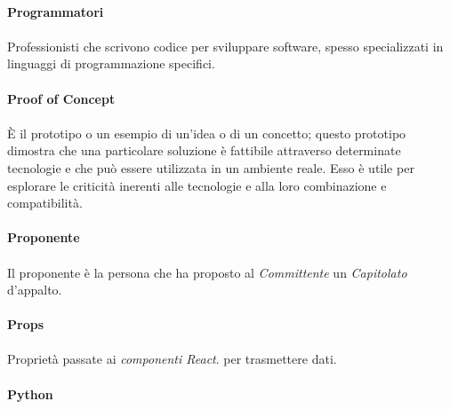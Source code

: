 \documentclass[10pt, a4paper]{article}
\begin{document}
\vspace{2em}
\paragraph{Programmatori}\noindent\hrulefill
\paragraph{}Professionisti che scrivono codice per sviluppare software, spesso specializzati in linguaggi di programmazione specifici.


\vspace{2em}
\paragraph{Proof of Concept}\noindent\hrulefill
\paragraph{}È il prototipo o un esempio di un’idea o di un concetto; questo prototipo dimostra che una particolare soluzione è fattibile attraverso determinate tecnologie e che può essere utilizzata in un ambiente reale. Esso è utile per esplorare le criticità inerenti alle tecnologie e alla loro combinazione e compatibilità.

\vspace{2em}
\paragraph{Proponente}\noindent\hrulefill
\paragraph{}Il proponente è la persona che ha proposto al \textit{Committente\pg} un \textit{Capitolato\pg}
d’appalto.

\vspace{2em}
\paragraph{Props}\noindent\hrulefill
\paragraph{}Proprietà passate ai \textit{componenti React\pg}. per trasmettere dati.


\vspace{2em}
\paragraph{Python}\noindent\hrulefill
\end{document}
